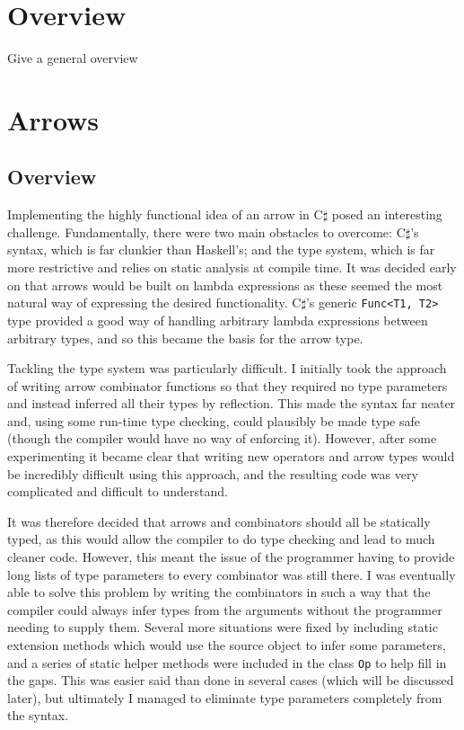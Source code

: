 \documentclass[12pt,twoside,notitlepage]{report}
\begin{document}
\section{Overview}

Give a general overview


\section{Arrows}

\subsection{Overview} \label{sec:arrows_overview}

Implementing the highly functional idea of an arrow in C$\sharp$ posed an interesting challenge. Fundamentally, there were two main obstacles to overcome: C$\sharp$'s syntax, which is far clunkier than Haskell's; and the type system, which is far more restrictive and relies on static analysis at compile time. It was decided early on that arrows would be built on lambda expressions as these seemed the most natural way of expressing the desired functionality. C$\sharp$'s generic \texttt{Func<T1, T2>} type provided a good way of handling arbitrary lambda expressions between arbitrary types, and so this became the basis for the arrow type.

Tackling the type system was particularly difficult. I initially took the approach of writing arrow combinator functions so that they required no type parameters and instead inferred all their types by reflection. This made the syntax far neater and, using some run-time type checking, could plausibly be made type safe (though the compiler would have no way of enforcing it). However, after some experimenting it became clear that writing new operators and arrow types would be incredibly difficult using this approach, and the resulting code was very complicated and difficult to understand.

It was therefore decided that arrows and combinators should all be statically typed, as this would allow the compiler to do type checking and lead to much cleaner code. However, this meant the issue of the programmer having to provide long lists of type parameters to every combinator was still there. I was eventually able to solve this problem by writing the combinators in such a way that the compiler could always infer types from the arguments without the programmer needing to supply them. Several more situations were fixed by including static extension methods which would use the source object to infer some parameters, and a series of static helper methods were included in the class \texttt{Op} to help fill in the gaps. This was easier said than done in several cases (which will be discussed later), but ultimately I managed to eliminate type parameters completely from the syntax.
\end{document}
